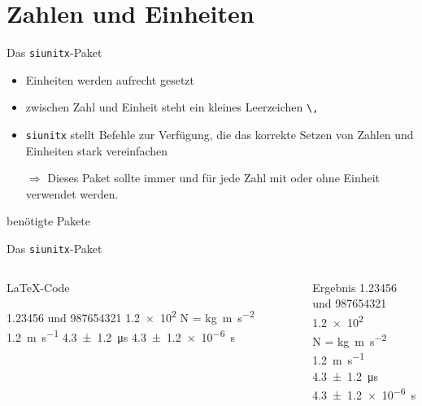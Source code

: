 \section{Zahlen und Einheiten}

\begin{frame}[fragile]{
  Das \texttt{siunitx}-Paket
  \hfill{}
}
\begin{itemize}
    \item Einheiten werden aufrecht gesetzt
    \item zwischen Zahl und Einheit steht ein kleines Leerzeichen \verb+\,+
    \item \texttt{siunitx} stellt Befehle zur Verfügung, die das korrekte Setzen von Zahlen und Einheiten stark vereinfachen
    \item[$\Rightarrow$] Dieses Paket sollte immer und für jede Zahl mit oder ohne Einheit verwendet werden.
\end{itemize}
  \begin{block}{benötigte Pakete}
    \begin{lstverbatim}
    \usepackage[locale=DE,
                separate-uncertainty=true,  %
                per-mode=symbol-or-fraction, %
            ]{siunitx}
    \end{lstverbatim}
  \end{block}
\end{frame}

\begin{frame}[fragile]{ Das \texttt{siunitx}-Paket }
  \begin{columns}[T]
    \begin{column}{0.6\textwidth}
      \begin{block}{\LaTeX-Code}
        \begin{lstverbatim}
        \num{1.23456} und \num{987654321}
        \num{1.2e2}
        \si{\newton} = \si{\kilo\gram\metre\per\second\squared}
        \SI{1.2}{\metre\per\second}
        \SI{4.3(12)}{\micro\second}
        \SI{4.3(12)e-6}{\second}
        \end{lstverbatim}
      \end{block}
    \end{column}
    \begin{column}{0.35\textwidth}
      \begin{block}{Ergebnis}
        \num{1.23456} und \num{987654321} \\
        \num{1.2e2} \\
        \smallbreak
        \si{\newton} = \si{\kilo\gram\metre\per\second\squared} \\
        \medbreak
        \SI{1.2}{\metre\per\second} \\
        \SI{4.3(12)}{\micro\second}
        \SI{4.3(12)e-6}{\second}
      \end{block}
    \end{column}
  \end{columns}
\end{frame}
